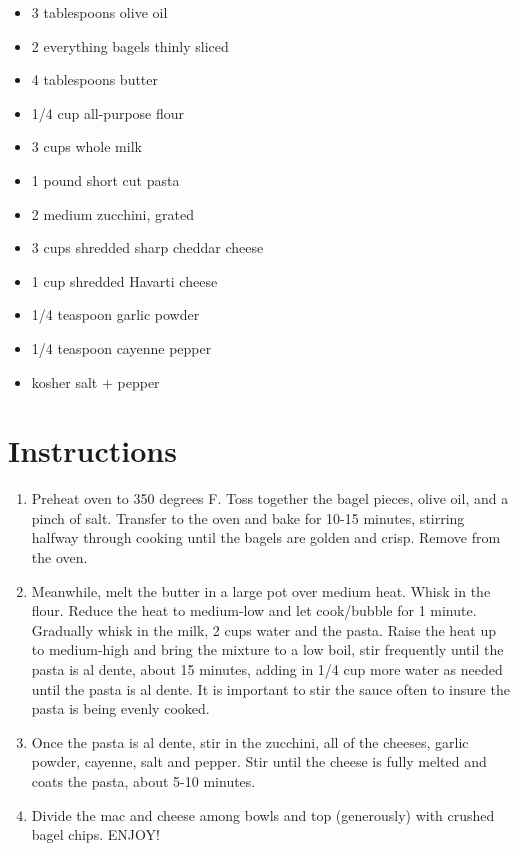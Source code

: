 \documentclass[
  letterpaper,
  DIV=11,
  numbers=noendperiod,
  titlepage=false]{scrreprt}
\providecommand{\tightlist}{%
  \setlength{\itemsep}{0pt}\setlength{\parskip}{0pt}}\usepackage{longtable,booktabs,array}
\begin{document}
\begin{itemize}
\tightlist
\item
  3 tablespoons olive oil
\item
  2 everything bagels thinly sliced
\item
  4 tablespoons butter
\item
  1/4 cup all-purpose flour
\item
  3 cups whole milk
\item
  1 pound short cut pasta
\item
  2 medium zucchini, grated
\item
  3 cups shredded sharp cheddar cheese
\item
  1 cup shredded Havarti cheese
\item
  1/4 teaspoon garlic powder
\item
  1/4 teaspoon cayenne pepper
\item
  kosher salt + pepper
\end{itemize}

\section{Instructions}\label{instructions-64}

\begin{enumerate}
\def\labelenumi{\arabic{enumi}.}
\tightlist
\item
  Preheat oven to 350 degrees F. Toss together the bagel pieces, olive
  oil, and a pinch of salt. Transfer to the oven and bake for 10-15
  minutes, stirring halfway through cooking until the bagels are golden
  and crisp. Remove from the oven.
\item
  Meanwhile, melt the butter in a large pot over medium heat. Whisk in
  the flour. Reduce the heat to medium-low and let cook/bubble for 1
  minute. Gradually whisk in the milk, 2 cups water and the pasta. Raise
  the heat up to medium-high and bring the mixture to a low boil, stir
  frequently until the pasta is al dente, about 15 minutes, adding in
  1/4 cup more water as needed until the pasta is al dente. It is
  important to stir the sauce often to insure the pasta is being evenly
  cooked.
\item
  Once the pasta is al dente, stir in the zucchini, all of the cheeses,
  garlic powder, cayenne, salt and pepper. Stir until the cheese is
  fully melted and coats the pasta, about 5-10 minutes.
\item
  Divide the mac and cheese among bowls and top (generously) with
  crushed bagel chips. ENJOY!
\end{enumerate}
\end{document}
